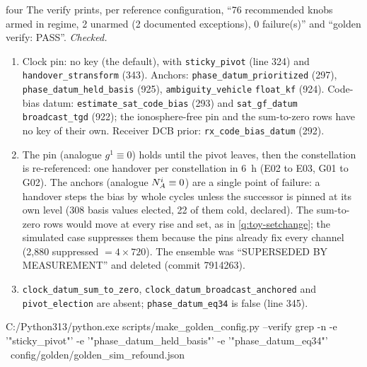 \begin{answer}{four}
\solution
The verify prints, per reference configuration, ``76 recommended knobs armed in
regime, 2 unarmed (2 documented exceptions), 0 failure(s)'' and ``golden verify:
PASS''. \emph{Checked.}
\begin{enumerate}[leftmargin=*, itemsep=1pt]
\item Clock pin: no key (the default), with \texttt{sticky\_pivot} (line 324) and
      \texttt{handover\_stransform} (343). Anchors: \texttt{phase\_datum\_prioritized}
      (297), \texttt{phase\_datum\_held\_basis} (925), \texttt{ambiguity\_vehicle}
      \texttt{float\_kf} (924). Code-bias datum: \texttt{estimate\_sat\_code\_bias} (293)
      and \texttt{sat\_gf\_datum} \texttt{broadcast\_tgd} (922); the ionosphere-free pin and
      the sum-to-zero rows have no key of their own. Receiver DCB prior:
      \texttt{rx\_code\_bias\_datum} (292).
\item The pin (analogue $g^1 \equiv 0$) holds until the pivot leaves, then the
      constellation is re-referenced: one handover per constellation in 6~h (E02 to
      E03, G01 to G02). The anchors (analogue $N^i_A \equiv 0$) are a single point of
      failure: a handover steps the bias by whole cycles unless the successor is
      pinned at its own level (308 basis values elected, 22 of them cold, declared).
      The sum-to-zero rows would move at every rise and set, as in
      \cref{q:toy-setchange}; the simulated case suppresses them because the pins
      already fix every channel (2,880 suppressed $= 4\times720$). The ensemble was
      ``SUPERSEDED BY MEASUREMENT'' and deleted (commit 7914263).
\item \texttt{clock\_datum\_sum\_to\_zero}, \texttt{clock\_datum\_broadcast\_anchored} and
      \texttt{pivot\_election} are absent; \texttt{phase\_datum\_eq34} is false (line 345).
\end{enumerate}
\chk
\begin{cmd}
C:/Python313/python.exe scripts/make_golden_config.py --verify
grep -n -e '"sticky_pivot"' -e '"phase_datum_held_basis"' -e '"phase_datum_eq34"' \
    config/golden/golden_sim_refound.json
\end{cmd}
\end{answer}

